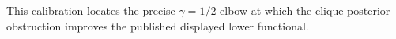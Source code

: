 This calibration locates the precise \(\gamma=1/2\) elbow at which the clique posterior obstruction improves the published displayed lower functional.